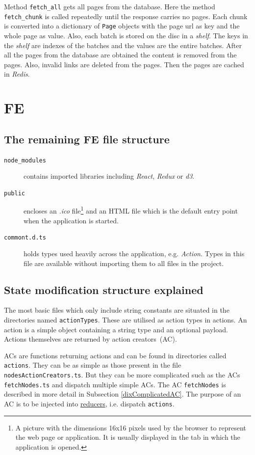 \begin{appendices}
Method \texttt{fetch\_all} gets all pages from the database. Here the method \texttt{fetch\_chunk} is called repeatedly until the response carries no pages. Each chunk is converted into a dictionary of \texttt{Page} objects with the page url as key and the whole page as value. Also, each batch is stored on the disc in a \textit{shelf}. The keys in the \textit{shelf} are indexes of the batches and the values are the entire batches. After all the pages from the database are obtained the content is removed from the pages. Also, invalid links are deleted from the pages. Then the pages are cached in \textit{Redis}.

\section{FE}
\subsection{The remaining FE file structure}
\begin{description}
    \item[\texttt{node\_modules}] contains imported libraries including \textit{React}, \textit{Redux} or \textit{d3}.
    \item[\texttt{public}] encloses an \textit{.ico} file\footnote {A picture with the dimensions 16x16 pixels used by the browser to represent the web page or application. It is usually displayed in the tab in which the application is opened.} and an HTML file which is the default entry point when the application is started. 
    \item[\texttt{commont.d.ts}] holds types used heavily across the application, e.g. \textit{Action}. Types in this file are available without importing them to all files in the project.
\end{description}

\subsection{State modification structure explained}\label{dixModifyReduxState}
The most basic files which only include string constants are situated in the directories named \texttt{actionTypes}.  These are utilised as action types in actions. An action is a simple object containing a string type and an optional payload. Actions themselves are returned by action creators~(AC). 

ACs are functions returning actions and can be found in directories called \texttt{actions}. They can be as simple as those present in the file \texttt{nodesActionCreators.ts}. But they can be more complicated such as the ACs \texttt{fetchNodes.ts} and dispatch multiple simple ACs. The AC \texttt{fetchNodes} is described in more detail in Subsection \ref{dixComplicatedAC}. The purpose of an AC is to be injected into \hyperlink{reducers}{reducers}, i.e. dispatch \texttt{actions}. 


\end{appendices}
